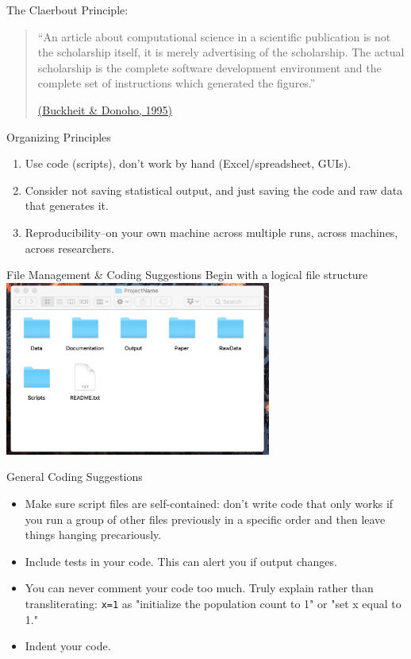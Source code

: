 \documentclass{beamer}
\begin{document}
\begin{frame}
The Claerbout Principle:

\begin{quote}``An article about computational science in a scientific publication is not the scholarship itself, it is merely advertising of the scholarship. The actual scholarship is the complete software development environment and the complete set of instructions which generated the figures.'' 

\href{https://statweb.stanford.edu/~wavelab/Wavelab_850/wavelab.pdf}{(Buckheit \& Donoho, 1995)}\end{quote}
\end{frame}

\begin{frame}{Organizing Principles}
\begin{enumerate}
	\item Use code (scripts), don't work by hand (Excel/spreadsheet, GUIs).
	\item Consider not saving statistical output, and just saving the code and raw data that generates it.
	\item Reproducibility--on your own machine across multiple runs, across machines, across researchers. 
\end{enumerate}
\end{frame}

\begin{frame}{File Management \& Coding Suggestions}
Begin with a logical file structure 
\includegraphics[height=2.25in]{../Images/files.png}
\end{frame}


\begin{frame}{General Coding Suggestions}

\begin {itemize} 
\item Make sure script files are self-contained: don't write code that only works if you run a group of other files previously in a specific order and then leave things hanging precariously. 

\item Include tests in your code.   
This can alert you if output changes. 

\item You can never comment your code too much. Truly explain rather than transliterating: \texttt{x=1} as "initialize the population count to 1" or "set x equal to 1."
 
\item Indent your code.   
\end{itemize}
\end{frame}
\end{document}
